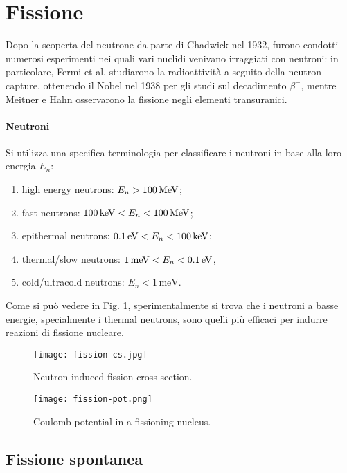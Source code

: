 \section{Fissione}

Dopo la scoperta del neutrone da parte di Chadwick nel 1932, furono condotti numerosi esperimenti nei quali vari nuclidi venivano irraggiati con neutroni: in particolare, Fermi et al. studiarono la radioattività a seguito della neutron capture, ottenendo il Nobel nel 1938 per gli studi sul decadimento $ \beta^- $, mentre Meitner e Hahn osservarono la fissione negli elementi transuranici.

\paragraph{Neutroni}

Si utilizza una specifica terminologia per classificare i neutroni in base alla loro energia $ E_n $:
\begin{enumerate}
	\item high energy neutrons: $ E_n > 100\,\mathrm{MeV} $;
	\item fast neutrons: $ 100\,\mathrm{keV} < E_n < 100\,\mathrm{MeV} $;
	\item epithermal neutrons: $ 0.1\,\mathrm{eV} < E_n < 100\,\mathrm{keV} $;
	\item thermal/slow neutrons: $ 1\,\text{meV} < E_n < 0.1\,\mathrm{eV} $,
	\item cold/ultracold neutrons: $ E_n < 1\,\text{meV} $.
\end{enumerate}
Come si può vedere in Fig. \ref{fission-cs}, sperimentalmente si trova che i neutroni a basse energie, specialmente i thermal neutrons, sono quelli più efficaci per indurre reazioni di fissione nucleare.

\begin{figure}
	\centering
	\texttt{[image: fission-cs.jpg]}
	\caption{Neutron-induced fission cross-section.}
	\label{fission-cs}
\end{figure}
\begin{figure}
	\centering
	\texttt{[image: fission-pot.png]}
	\caption{Coulomb potential in a fissioning nucleus.}
	\label{fission-pot}
\end{figure}

\subsection{Fissione spontanea}

